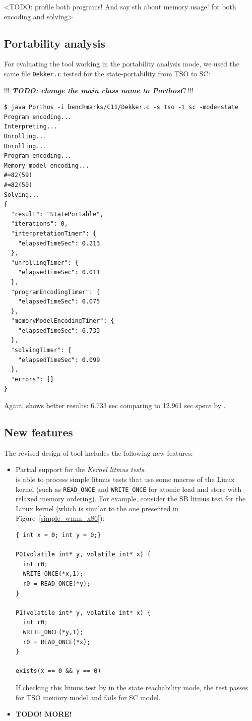 <TODO: profile both programs! And say sth about memory usage! for both encoding and solving> 


\subsection{Portability analysis}
\label{ch:eval:perf:port}

For evaluating the tool working in the portability analysis mode, we used the same file \texttt{Dekker.c} tested for the state-portability from TSO to SC: %

!!! \textit{\textbf{TODO: change the main class name to PorthosC }} !!!

\begin{lstlisting}
$ java Porthos -i benchmarks/C11/Dekker.c -s tso -t sc -mode=state
Program encoding...
Interpreting...
Unrolling...
Unrolling...
Program encoding...
Memory model encoding...
#=82(59)
#=82(59)
Solving...
{
  "result": "StatePortable",
  "iterations": 0,
  "interpretationTimer": {
    "elapsedTimeSec": 0.213
  },
  "unrollingTimer": {
    "elapsedTimeSec": 0.011
  },
  "programEncodingTimer": {
    "elapsedTimeSec": 0.075
  },
  "memoryModelEncodingTimer": {
    "elapsedTimeSec": 6.733
  },
  "solvingTimer": {
    "elapsedTimeSec": 0.099
  },
  "errors": []
}
\end{lstlisting}

Again, \porthos[2] shows better results: 6.733 sec comparing to 12.961 sec spent by \porthos[1].


\subsection{New features}
\label{ch:eval:perf:feat}

The revised design of \porthos{} tool includes the following new features:
\begin{itemize}
\item Partial support for the \textit{Kernel litmus tests}.\\
\porthos[2] is able to process simple litmus tests that use some macros of the Linux kernel (such as \texttt{READ\_ONCE} and \texttt{WRITE\_ONCE} for atomic load and store with relaxed memory ordering).
For example, consider the SB litmus test for the Linux kernel (which is similar to the one presented in Figure~\ref{simple_wmm_x86}):
\begin{lstlisting}
{ int x = 0; int y = 0;}

P0(volatile int* y, volatile int* x) {
  int r0;
  WRITE_ONCE(*x,1);
  r0 = READ_ONCE(*y);
}

P1(volatile int* y, volatile int* x) {
  int r0;
  WRITE_ONCE(*y,1);
  r0 = READ_ONCE(*x);
}

exists(x == 0 && y == 0)
\end{lstlisting}
If checking this litmus test by \porthos[2] in the state reachability mode, the test passes for TSO memory model and fails for SC model.

\item \textbf{TODO! MORE!}
\end{itemize}



